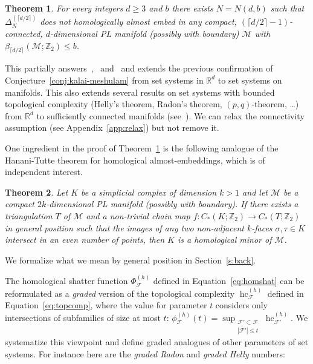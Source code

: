 \documentclass[a4paper,UKenglish,thm-restate]{article}
\newcommand{\R}{\mathbb{R}}
\newcommand{\Z}{\mathbb{Z}}
\newcommand{\F}{\mathcal{F}}
\newcommand{\M}{\mathcal{M}}
\DeclareMathOperator{\hc}{hc}
\newcommand{\defn}[1]{\emph{\color{violet}#1}}
\newtheorem{theorem}{Theorem}
\begin{document}
\begin{theorem}\label{t:forbidden}
For every integers $d \ge 3$ and $b$ there exists $N=N(d,b)$ such that $\Delta_{N}^{(\lceil d/2 \rceil)}$ does not homologically almost embed in any compact, $(\lceil d/2 \rceil-1)$-connected, $d$-dimensional PL manifold (possibly with boundary) $\M$ with $\beta_{\lceil d/2 \rceil}(\M;\Z_2) \le b$.
\end{theorem}

\noindent
This partially answers~\cite[Problem~3]{patakova2022bounding},~\cite[Conjecture~1.7]{steppingUp} and~\cite[Conjecture~2]{patak2025sharper} and extends the previous confirmation of Conjecture~\ref{conj:kalai-meshulam} from set systems in $\R^d$ to set systems on manifolds. This also extends several results on set systems with bounded topological complexity (Helly's theorem, Radon's theorem, $(p,q)$-theorem, \ldots) from $\R^d$ to sufficiently connected manifolds (see~\cite{patakova2022bounding,steppingUp}). We can relax the connectivity assumption (see Appendix~\ref{app:relax}) but not remove it.

\medskip

 One ingredient in the proof of Theorem~\ref{t:forbidden} is the following analogue of the Hanani-Tutte theorem for homological almost-embeddings, which is of independent interest.

\begin{theorem}\label{t:HT}
  Let $K$ be a simplicial complex of dimension $k>1$ and let $\M$ be a compact
  $2k$-dimensional PL manifold (possibly with boundary). If there exists a triangulation $T$ of $\M$ and a non-trivial chain map $f:C_*(K; \Z_2)\to C_*(T; \Z_2)$ in
  general position such that the images of any two non-adjacent
  $k$-faces $\sigma,\tau\in K$ intersect in an even number of points,
  then $K$ is a homological minor of $\mathcal{M}$.
\end{theorem}

\noindent
We formalize what we mean by general position in Section~\ref{s:back}.

\medskip

The homological shatter function $\Phi_\F^{(h)}$ defined in Equation~\eqref{eq:homshat} can be reformulated as a \emph{graded} version of the topological complexity $\hc^{(h)}_\F$ defined in Equation~\eqref{eq:topcomp}, where the value for parameter $t$ considers only intersections of subfamilies of size at most $t$: $\phi_\F^{(h)}(t)= \sup_{\substack{\F'\subset\F\\ |\F'| \le t} }\hc^{(h)}_{\F'}$. We systematize this viewpoint and define graded analogues of other parameters of set systems. For instance here are the \defn{graded Radon} and \defn{graded Helly} numbers:
\end{document}
